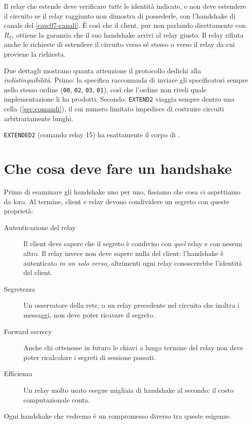 Il relay che estende deve verificare \emph{tutte} le identità indicate, e non deve estendere il circuito se il relay raggiunto non dimostra di possederle, con l'handshake di canale del \cref{cap:07-canali}. È così che il client, pur non parlando direttamente con $R_2$, ottiene la garanzia che il suo handshake arrivi al relay giusto. Il relay rifiuta anche le richieste di estendere il circuito verso sé stesso o verso il relay da cui proviene la richiesta.

Due dettagli mostrano quanta attenzione il protocollo dedichi alla \emph{indistinguibilità}. Primo: la specifica raccomanda di inviare gli specificatori sempre nello stesso ordine (\texttt{00}, \texttt{02}, \texttt{03}, \texttt{01}), così che l'ordine non riveli quale implementazione li ha prodotti. Secondo: \texttt{EXTEND2} viaggia sempre dentro una cella  (\cref{sec:comandi}), il cui numero limitato impedisce di costruire circuiti arbitrariamente lunghi.

\texttt{EXTENDED2} (comando relay 15) ha esattamente il corpo di .

\section{Che cosa deve fare un handshake}\label{sec:circ-requisiti}

Prima di esaminare gli handshake uno per uno, fissiamo che cosa ci aspettiamo da loro. Al termine, client e relay devono condividere un segreto con queste proprietà:
\begin{description}
  \item[Autenticazione del relay] Il client deve sapere che il segreto è condiviso con \emph{quel} relay e con nessun altro. Il relay invece non deve sapere nulla del client: l'handshake è autenticato \emph{in un solo verso}, altrimenti ogni relay conoscerebbe l'identità del client.
  \item[Segretezza] Un osservatore della rete, o un relay precedente nel circuito che inoltra i messaggi, non deve poter ricavare il segreto.
  \item[Forward secrecy] Anche chi ottenesse in futuro le chiavi a lungo termine del relay non deve poter ricalcolare i segreti di sessione passati.
  \item[Efficienza] Un relay molto usato esegue migliaia di handshake al secondo: il costo computazionale conta.
\end{description}
Ogni handshake che vedremo è un compromesso diverso tra queste esigenze.

